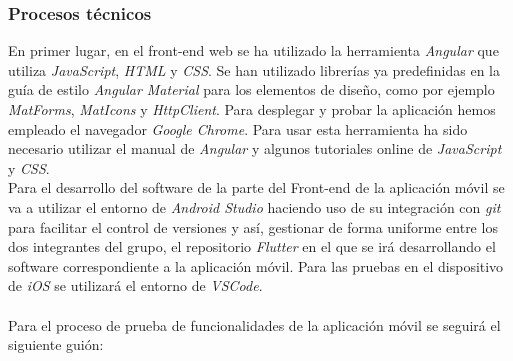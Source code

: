 \documentclass{article}
\begin{document}
\subsubsection{Procesos técnicos}
En primer lugar, en el front-end web se ha utilizado la herramienta \textit{Angular} que utiliza \textit{JavaScript}, \textit{HTML} y \textit{CSS}. Se han utilizado librerías ya predefinidas en la guía de estilo \textit{Angular Material} para los elementos de diseño, como por ejemplo \textit{MatForms}, \textit{MatIcons} y \textit{HttpClient}. Para desplegar y probar la aplicación hemos empleado el navegador \textit{Google Chrome}.
Para usar esta herramienta ha sido necesario utilizar el manual de \textit{Angular} y algunos tutoriales online de \textit{JavaScript} y \textit{CSS}.\\
\newpage
Para el desarrollo del software de la parte del Front-end de la aplicación móvil se va a utilizar el entorno de \textit{Android Studio} haciendo uso de su integración con \textit{git} para facilitar el control de versiones y así, gestionar de forma uniforme entre los dos integrantes del grupo, el repositorio \textit{Flutter} en el que se irá desarrollando el software correspondiente a la aplicación móvil. Para las pruebas en el dispositivo de \textit{iOS} se utilizará el entorno de \textit{VSCode}.\\\\
Para el proceso de prueba de funcionalidades de la aplicación móvil se seguirá el siguiente guión:
\end{document}
